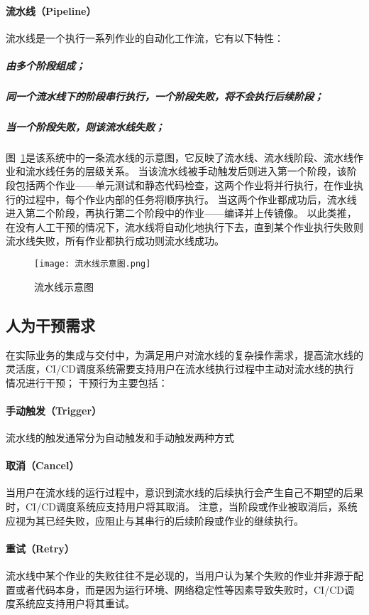 \paragraph{流水线（Pipeline）}
流水线是一个执行一系列作业的自动化工作流，它有以下特性：
\subparagraph{由多个阶段组成；}
\subparagraph{同一个流水线下的阶段串行执行，一个阶段失败，将不会执行后续阶段；}
\subparagraph{当一个阶段失败，则该流水线失败；}

图~\ref{fig:流水线示意图}是该系统中的一条流水线的示意图，它反映了流水线、流水线阶段、流水线作业和流水线任务的层级关系。
当该流水线被手动触发后则进入第一个阶段，该阶段包括两个作业——单元测试和静态代码检查，这两个作业将并行执行，在作业执行的过程中，每个作业内部的任务将顺序执行。
当这两个作业都成功后，流水线进入第二个阶段，再执行第二个阶段中的作业——编译并上传镜像。
以此类推，在没有人工干预的情况下，流水线将自动化地执行下去，直到某个作业执行失败则流水线失败，所有作业都执行成功则流水线成功。

\begin{figure}[h]
  \centering
  \texttt{[image: 流水线示意图.png]}
  \caption{流水线示意图}
  \label{fig:流水线示意图}
\end{figure}



\subsection{人为干预需求}
在实际业务的集成与交付中，为满足用户对流水线的复杂操作需求，提高流水线的灵活度，CI/CD调度系统需要支持用户在流水线执行过程中主动对流水线的执行情况进行干预；
干预行为主要包括：

\paragraph{手动触发（Trigger）}
流水线的触发通常分为自动触发和手动触发两种方式

\paragraph{取消（Cancel）}
当用户在流水线的运行过程中，意识到流水线的后续执行会产生自己不期望的后果时，CI/CD调度系统应支持用户将其取消。
注意，当阶段或作业被取消后，系统应视为其已经失败，应阻止与其串行的后续阶段或作业的继续执行。

\paragraph{重试（Retry）}
流水线中某个作业的失败往往不是必现的，当用户认为某个失败的作业并非源于配置或者代码本身，而是因为运行环境、网络稳定性等因素导致失败时，CI/CD调度系统应支持用户将其重试。

